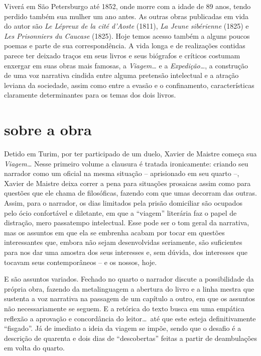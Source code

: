 Viverá em São Petersburgo até 1852, onde morre com a idade de 89 anos,
tendo perdido também sua mulher um ano antes. As outras obras publicadas 
em vida do autor são \textit{Le Lépreux de la cité d’Aoste} (1811), \textit{La Jeune sibérienne} 
(1825) e \textit{Les Prisonniers du Caucase} (1825). Hoje temos acesso também a alguns 
poucos poemas e parte de sua correspondência.  
A vida longa e de realizações contidas parece ter deixado traços em seus
livros e seus biógrafos e críticos costumam enxergar em suas obras mais
famosas, a \textit{Viagem\ldots} e a \textit{Expedição\ldots}, a construção
de uma voz narrativa cindida entre alguma pretensão intelectual e a
atração leviana da sociedade, assim como entre a evasão e o
confinamento, características claramente determinantes para os temas
dos dois livros. 

\section{sobre a obra}

Detido em Turim, por ter participado de um duelo, Xavier de Maistre
começa sua \textit{Viagem\ldots} Nesse primeiro volume a clausura é
tratada ironicamente: criando seu narrador como um oficial na mesma
situação -- aprisionado em seu quarto --, Xavier de Maistre deixa
correr a pena para situações prosaicas assim como para questões que ele
chama de filosóficas, fazendo com que umas decorram das outras. Assim,
para o narrador, os dias limitados pela prisão domiciliar são ocupados
pelo ócio confortável e diletante, em que a ``viagem'' literária faz o
papel de distração, mero passatempo intelectual. Esse pode ser o tom
geral da narrativa, mas os assuntos em que ela se embrenha acabam por
tocar em questões interessantes que, embora não sejam desenvolvidas
seriamente, são suficientes para nos dar uma amostra dos seus
interesses e, sem dúvida, dos interesses que tocavam seus
contemporâneos -- e os nossos, hoje. 

E são assuntos variados. Fechado no quarto o narrador discute a
possibilidade da própria obra, fazendo da metalinguagem a abertura do
livro e a linha mestra que sustenta a voz narrativa na passagem de um
capítulo a outro, em que os assuntos não necessariamente se seguem. E a
retórica do texto busca em uma empática reflexão a aprovação e
concordância do leitor\ldots\ até que este esteja definitivamente
``fisgado''. Já de imediato a ideia da viagem se impõe, sendo que o
desafio é a descrição de quarenta e dois dias de ``descobertas'' feitas a
partir de deambulações em volta do quarto. 

